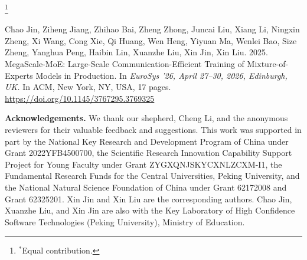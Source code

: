 \documentclass[sigplan,twocolumn]{acmart}
\newcommand{\parabf}[1]{\medskip\noindent\textbf{#1}}
\newcommand{\sysname}{MegaScale-MoE\xspace}
\begin{document}
\renewcommand{\shortauthors}{C. Jin, et al}
\renewcommand{\shorttitle}{\sysname: Large-Scale Communication-Efficient Training...}
\begin{sloppypar}


\maketitle
{\let\thefootnote\relax\footnote{{$^*$Equal contribution.}}}

\vspace{-6pt}
{\par\smallskip\small{}\par\nobreak
  \noindent Chao Jin, Ziheng Jiang, Zhihao Bai, Zheng Zhong, Juncai Liu, Xiang Li, Ningxin Zheng, Xi Wang, Cong Xie, Qi Huang, Wen Heng, Yiyuan Ma, Wenlei Bao, Size Zheng, Yanghua Peng, Haibin Lin, Xuanzhe Liu, Xin Jin, Xin Liu. 2025. MegaScale-MoE: Large-Scale Communication-Efficient Training of Mixture-of-Experts Models in Production. 
  In \textit{EuroSys ’26, April
27–30, 2026, Edinburgh, UK.} In  ACM, New York, NY, USA, 17 pages. 
\url{https://doi.org/10.1145/3767295.3769325}
}



% 

% 





\parabf{Acknowledgements.}
We thank our shepherd, Cheng Li, and the anonymous reviewers for their valuable feedback and suggestions.
This work was supported in part by the National Key Research and Development Program of China under Grant 2022YFB4500700, the Scientific Research Innovation Capability Support Project for Young Faculty under Grant ZYGXQNJSKYCXNLZCXM-I1, the Fundamental Research Funds for the Central Universities, Peking University, and the National Natural Science Foundation of China under Grant 62172008 and Grant 62325201.
Xin Jin and Xin Liu are the corresponding authors.
Chao Jin, Xuanzhe Liu, and Xin Jin are also with the Key Laboratory of High Confidence Software Technologies (Peking University), Ministry of Education.

\label{lastpage}

\def\UrlBreaks{\do\/\do-}



\clearpage

\balance


\end{sloppypar}
\end{document}
